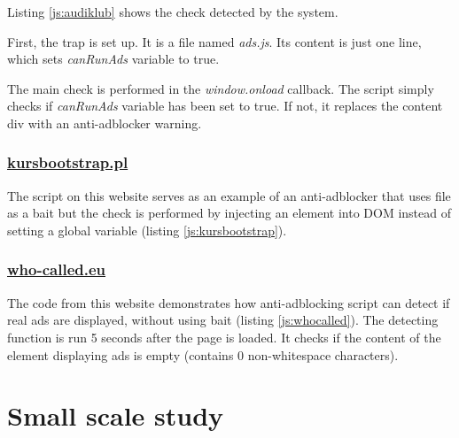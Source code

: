 Listing \ref{js:audiklub} shows the check detected by the system.



First, the trap is set up. It is a file named \emph{ads.js}.
Its content is just one line, which sets \emph{canRunAds} variable to true.

The main check is performed in the \emph{window.onload} callback. The script simply checks
if \emph{canRunAds} variable has been set to true. If not, it replaces the content div with an anti-adblocker warning.

\subsubsection{\url{kursbootstrap.pl}}
The script on this website serves as an example of an anti-adblocker that uses file as a bait
but the check is performed by injecting an element into DOM instead of setting a global variable
(listing \ref{js:kursbootstrap}).


                       
\subsubsection{\url{who-called.eu}}
The code from this website demonstrates how anti-adblocking script can detect if real
ads are displayed, without using bait (listing \ref{js:whocalled}).
The detecting function is run 5 seconds after the page is loaded. It checks if the content 
of the element displaying ads is empty (contains 0 non-whitespace characters).


                       




\section{Small scale study}

